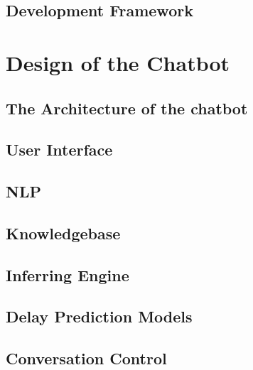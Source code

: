 \documentclass[11pt]{article}
\begin{document}



 
\subsection{Development Framework}


\section{Design of the Chatbot}

 
\subsection{The Architecture of the chatbot}

\subsection{User Interface} 

\subsection{NLP}

\subsection{Knowledgebase}

% 
\subsection{Inferring Engine}

\subsection{Delay Prediction Models}

\subsection{Conversation Control}
\end{document}
